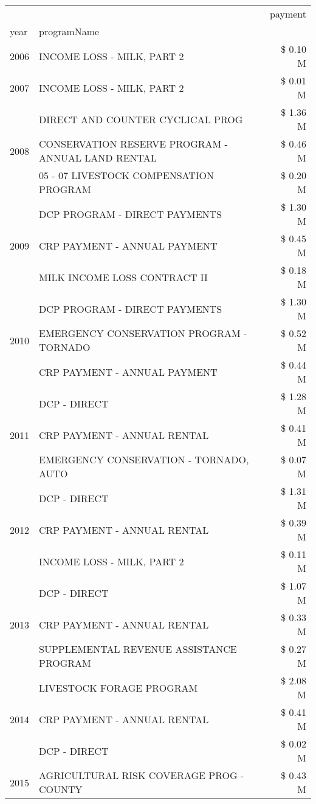 \begin{tabular}{llr}
\toprule
 &  & payment \\
year & programName &  \\
\midrule
2006 & INCOME LOSS - MILK, PART 2 & \$ 0.10 M \\
\cline{1-3}
2007 & INCOME LOSS - MILK, PART 2 & \$ 0.01 M \\
\cline{1-3}
\multirow[t]{3}{*}{2008} & DIRECT AND COUNTER CYCLICAL PROG & \$ 1.36 M \\
 & CONSERVATION RESERVE PROGRAM - ANNUAL LAND RENTAL & \$ 0.46 M \\
 & 05 - 07 LIVESTOCK COMPENSATION PROGRAM & \$ 0.20 M \\
\cline{1-3}
\multirow[t]{3}{*}{2009} & DCP PROGRAM - DIRECT PAYMENTS & \$ 1.30 M \\
 & CRP PAYMENT - ANNUAL PAYMENT & \$ 0.45 M \\
 & MILK INCOME LOSS CONTRACT II & \$ 0.18 M \\
\cline{1-3}
\multirow[t]{3}{*}{2010} & DCP PROGRAM - DIRECT PAYMENTS & \$ 1.30 M \\
 & EMERGENCY CONSERVATION PROGRAM - TORNADO & \$ 0.52 M \\
 & CRP PAYMENT - ANNUAL PAYMENT & \$ 0.44 M \\
\cline{1-3}
\multirow[t]{3}{*}{2011} & DCP - DIRECT & \$ 1.28 M \\
 & CRP PAYMENT - ANNUAL RENTAL & \$ 0.41 M \\
 & EMERGENCY CONSERVATION - TORNADO, AUTO & \$ 0.07 M \\
\cline{1-3}
\multirow[t]{3}{*}{2012} & DCP - DIRECT & \$ 1.31 M \\
 & CRP PAYMENT - ANNUAL RENTAL & \$ 0.39 M \\
 & INCOME LOSS - MILK, PART 2 & \$ 0.11 M \\
\cline{1-3}
\multirow[t]{3}{*}{2013} & DCP - DIRECT & \$ 1.07 M \\
 & CRP PAYMENT - ANNUAL RENTAL & \$ 0.33 M \\
 & SUPPLEMENTAL REVENUE ASSISTANCE PROGRAM & \$ 0.27 M \\
\cline{1-3}
\multirow[t]{3}{*}{2014} & LIVESTOCK FORAGE PROGRAM & \$ 2.08 M \\
 & CRP PAYMENT - ANNUAL RENTAL & \$ 0.41 M \\
 & DCP - DIRECT & \$ 0.02 M \\
\cline{1-3}
\multirow[t]{3}{*}{2015} & AGRICULTURAL RISK COVERAGE PROG - COUNTY & \$ 0.43 M \\

\end{tabular}
